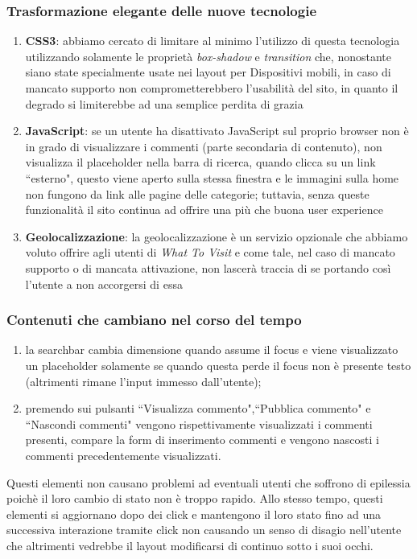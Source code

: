 \subsubsection{Trasformazione elegante delle nuove tecnologie}
\begin{enumerate}
\item \textbf{CSS3}: abbiamo cercato di limitare al minimo l'utilizzo di questa tecnologia utilizzando solamente le proprietà \textit{box-shadow} e \textit{transition} che, nonostante siano state specialmente usate nei layout per Dispositivi mobili, in caso di mancato supporto non comprometterebbero l'usabilità del sito, in quanto il degrado si limiterebbe ad una semplice perdita di grazia
\item \textbf{JavaScript}: se un utente ha disattivato JavaScript sul proprio
browser non è in grado di visualizzare i commenti (parte secondaria di contenuto), non visualizza il placeholder nella barra di ricerca, quando clicca su un link ``esterno", questo viene aperto sulla stessa finestra e le immagini sulla home non fungono da link alle pagine delle categorie; tuttavia, senza queste funzionalità il sito continua ad offrire una più che buona user experience
\item \textbf{Geolocalizzazione}: la geolocalizzazione è un servizio opzionale che abbiamo voluto offrire agli utenti di \textit{What To Visit} e come tale, nel caso di mancato supporto o di mancata attivazione, non lascerà traccia di se portando così l'utente a non accorgersi di essa
\end{enumerate}

\subsubsection{Contenuti che cambiano nel corso del tempo}
\begin{enumerate}
\item la searchbar cambia dimensione quando assume il focus e viene
visualizzato un placeholder solamente se quando questa perde il focus non è
presente testo (altrimenti rimane l'input immesso dall'utente);
\item premendo sui pulsanti ``Visualizza commento",``Pubblica commento" e
``Nascondi commenti" vengono rispettivamente visualizzati i commenti presenti,
compare la form di inserimento commenti e vengono nascosti i commenti
precedentemente visualizzati.
\end{enumerate}

Questi elementi non causano problemi ad eventuali utenti che soffrono di
epilessia poichè il loro cambio di stato non è troppo rapido. Allo stesso
tempo, questi elementi si aggiornano dopo dei click e mantengono il loro stato
fino ad una successiva interazione tramite click non causando un senso di
disagio nell'utente che altrimenti vedrebbe il layout modificarsi di continuo
sotto i suoi occhi.

